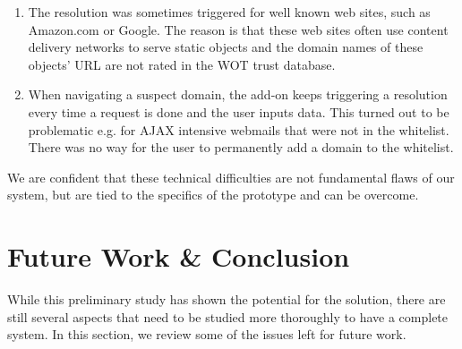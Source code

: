 \documentclass[11pt,styles/chicago,a4paper]{article}
\begin{document}
\begin{enumerate}
\item The resolution was sometimes triggered for well known web sites, such as Amazon.com or Google. The reason is that these web sites often use content delivery networks to serve static objects and the domain names of these objects' URL are not rated in the WOT trust database.
\item When navigating a suspect domain, the add-on keeps triggering a resolution every time a request is done and the user inputs data. This turned out to be problematic e.g. for AJAX intensive webmails that were not in the whitelist. There was no way for the user to permanently add a domain to the whitelist.
\end{enumerate}

We are confident that these technical difficulties are not fundamental flaws of our system, but are tied to the specifics of the prototype and can be overcome.


\section{Future Work \& Conclusion} %

While this preliminary study has shown the potential for the solution, there are still several aspects that need to be studied more thoroughly to have a complete system. In this section, we review some of the issues left for future work.
\end{document}
